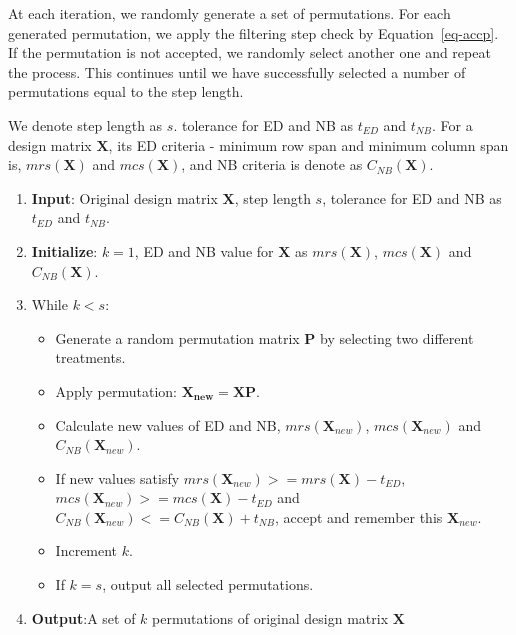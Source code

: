 \documentclass[
  a4paper,
  oneside,
  openany,
  12pt,
  onecolumn]{book}
\providecommand{\tightlist}{%
  \setlength{\itemsep}{0pt}\setlength{\parskip}{0pt}}\usepackage{longtable,booktabs,array}
\theoremstyle{plain}
\theoremstyle{definition}
\theoremstyle{remark}
\begin{document}
At each iteration, we randomly generate a set of permutations. For each
generated permutation, we apply the filtering step check by
Equation~\ref{eq-accp}. If the permutation is not accepted, we randomly
select another one and repeat the process. This continues until we have
successfully selected a number of permutations equal to the step length.

We denote step length as \(s\). tolerance for ED and NB as \(t_{ED}\)
and \(t_{NB}\). For a design matrix \(\boldsymbol{X}\), its ED criteria
- minimum row span and minimum column span is, \(mrs({\boldsymbol{X}})\)
and \(mcs({\boldsymbol{X}})\), and NB criteria is denote as
\(C_{NB}({\boldsymbol{X}})\).

\begin{enumerate}
\def\labelenumi{\arabic{enumi}.}
\tightlist
\item
  \textbf{Input}: Original design matrix \(\boldsymbol{X}\), step length
  \(s\), tolerance for ED and NB as \(t_{ED}\) and \(t_{NB}\).
\item
  \textbf{Initialize}: \(k = 1\), ED and NB value for \(\boldsymbol{X}\)
  as \(mrs({\boldsymbol{X}})\), \(mcs({\boldsymbol{X}})\) and
  \(C_{NB}({\boldsymbol{X}})\).
\item
  While \(k < s\):

  \begin{itemize}
  \tightlist
  \item
    Generate a random permutation matrix \(\boldsymbol{P}\) by selecting
    two different treatments.
  \item
    Apply permutation: \(\boldsymbol{X_{new} = X P}\).
  \item
    Calculate new values of ED and NB, \(mrs({\boldsymbol{X}_{new}})\),
    \(mcs({\boldsymbol{X}_{new}})\) and
    \(C_{NB}({\boldsymbol{X}_{new}})\).
  \item
    If new values satisfy
    \(mrs({\boldsymbol{X}_{new}}) >= mrs({\boldsymbol{X}}) - t_{ED}\),
    \(mcs({\boldsymbol{X}_{new}}) >= mcs({\boldsymbol{X}}) - t_{ED}\)
    and
    \(C_{NB}({\boldsymbol{X}_{new}}) <= C_{NB}({\boldsymbol{X}}) + t_{NB}\),
    accept and remember this \(\boldsymbol{X}_{new}\).
  \item
    Increment \(k\).
  \item
    If \(k = s\), output all selected permutations.
  \end{itemize}
\item
  \textbf{Output}:A set of \(k\) permutations of original design matrix
  \(\boldsymbol{X}\)
\end{enumerate}
\end{document}
